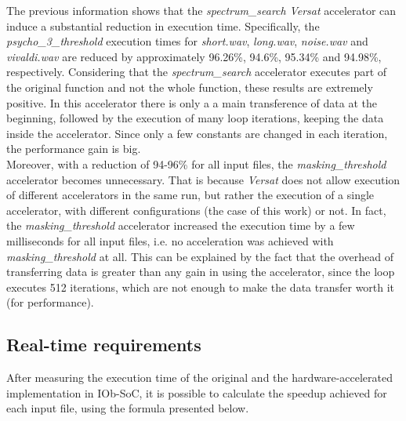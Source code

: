 The previous information shows that the \textit{spectrum\_search} \textit{Versat} accelerator can induce a substantial reduction in execution time. Specifically, the \textit{psycho\_3\_threshold} execution times for \textit{short.wav}, \textit{long.wav}, \textit{noise.wav} and \textit{vivaldi.wav} are reduced by approximately 96.26\%, 94.6\%, 95.34\% and 94.98\%, respectively.
Considering that the \textit{spectrum\_search} accelerator executes part of the original function and not the whole function, these results are extremely positive. In this accelerator there is only a a main transference of data at the beginning, followed by the execution of many loop iterations, keeping the data inside the accelerator. Since only a few constants are changed in each iteration, the performance gain is big.\\
Moreover, with a reduction of 94-96\% for all input files, the \textit{masking\_threshold} accelerator becomes unnecessary. That is because \textit{Versat} does not allow execution of different accelerators in the same run, but rather the execution of a single accelerator, with different configurations (the case of this work) or not.
In fact, the \textit{masking\_threshold} accelerator increased the execution time by a few milliseconds for all input files, i.e. no acceleration was achieved with \textit{masking\_threshold} at all. This can be explained by the fact that the overhead of transferring data is greater than any gain in using the accelerator, since the loop executes 512 iterations, which are not enough to make the data transfer worth it (for performance).


\subsection{Real-time requirements}


After measuring the execution time of the original and the hardware-accelerated implementation in IOb-SoC, it is possible to calculate the speedup achieved for each input file, using the formula presented below.

